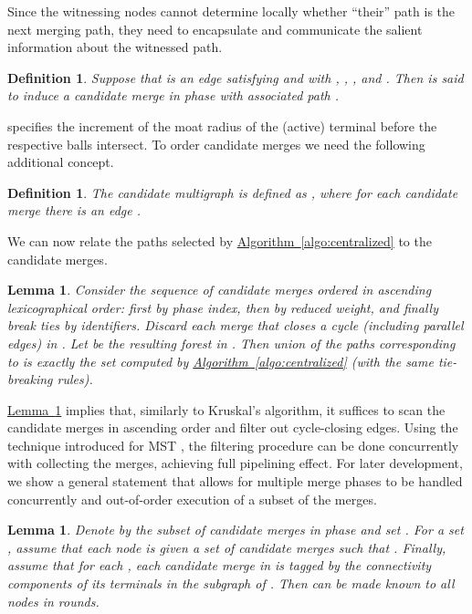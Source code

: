 \documentclass[letterpaper,11pt]{article}
\newtheorem{lemma}[theorem]{Lemma}
\newtheorem{definition}[theorem]{Definition}
\newcommand{\namedref}[2]{\hyperref[#2]{#1~\ref*{#2}}}
\newcommand{\lemmaref}[1]{\namedref{Lemma}{#1}}
\newcommand{\algref}[1]{\namedref{Algorithm}{#1}}
\begin{document}
Since the witnessing nodes cannot determine locally whether ``their''
path is the next merging path, they need to
encapsulate and communicate the salient information about the witnessed path.

\begin{definition}\label{def-cands}
Suppose that  is an edge satisfying  and
   with , , , 
   and . Then  is said to induce a
  \emph{candidate merge}  in phase  with \emph{associated path} .
\end{definition}
 specifies the
increment of the moat radius of the (active) terminal  before the
respective balls intersect.
To order candidate merges we need the following additional concept.


\begin{definition}\label{def-cand-graph}
The \emph{candidate multigraph} is defined as
, where for each candidate merge
 there is an edge
.
\end{definition}

We can now  relate the paths selected by
\algref{algo:centralized} to the candidate merges.

\begin{lemma}\label{lemma:equivalent}
Consider the sequence of candidate merges ordered in
ascending lexicographical order: 
first by phase index, then by reduced weight, and finally break ties by
identifiers.  Discard
each merge that closes a 
cycle (including parallel edges) in . Let  be
the resulting forest in . Then union of the paths corresponding
to    is exactly the set 
computed by \algref{algo:centralized} (with the same tie-breaking rules).
\end{lemma}

\lemmaref{lemma:equivalent} implies that, similarly to Kruskal's
algorithm, it suffices to scan the candidate
merges in ascending order and filter out cycle-closing edges.
Using the technique introduced for MST \cite{GarayKP-98,KuttenP-98},
the filtering 
procedure can be done concurrently with collecting the merges, achieving full
pipelining effect. For later development,
we show a general
statement that allows for multiple merge phases to be handled concurrently and
out-of-order execution of a subset of the merges.
\begin{lemma}\label{lemma:filtering}
  Denote by  the subset of candidate merges in phase 
  and set . For a set , assume that each node  is
  given a set  of candidate merges such that 
. Finally, assume
  that for each , each candidate merge in  is tagged
  by the connectivity components of its terminals in the subgraph
   of . Then  can be made known to all nodes in  rounds.
\end{lemma}
\end{document}
